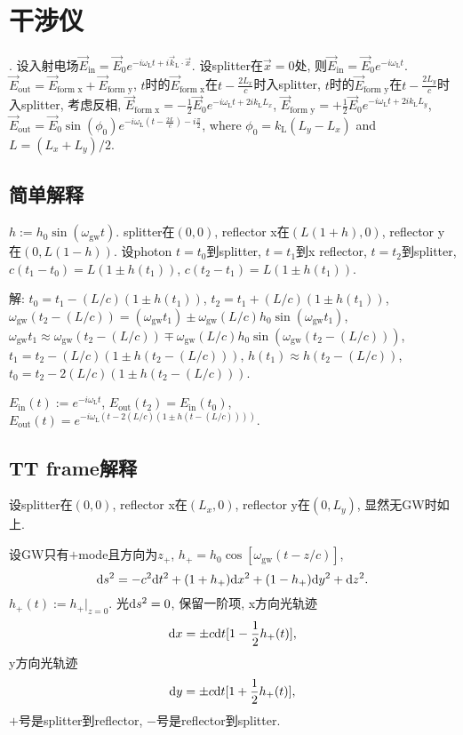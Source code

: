\chapter{干涉仪}

\cite{Maggiore2014}. 设入射电场$\vec{E}_\text{in}=\vec{E}_0e^{-i\omega_\text{L}t+i\vec{k}_\text{L}\cdot\vec{x}}$. 设splitter在$\vec{x}=0$处, 则$\vec{E}_\text{in}=\vec{E}_0e^{-i\omega_\text{L}t}$. $\vec{E}_\text{out}=\vec{E}_\text{form x}+\vec{E}_\text{form y}$, $t$时的$\vec{E}_\text{form x}$在$t-\frac{2L_x}{c}$时入splitter, $t$时的$\vec{E}_\text{form y}$在$t-\frac{2L_y}{c}$时入splitter, 考虑反相, $\vec{E}_\text{form x}=-\frac{1}{2}\vec{E}_0e^{-i\omega_\text{L}t+2ik_\text{L}L_x}$, $\vec{E}_\text{form y}=+\frac{1}{2}\vec{E}_0e^{-i\omega_\text{L}t+2ik_\text{L}L_y}$, $\vec{E}_\text{out}=\vec{E}_0\sin(\phi_0)e^{-i\omega_\text{L}(t-\frac{2L}{c})-i\frac{\pi}{2}}$, where $\phi_0=k_\text{L}(L_y-L_x)$ and $L=(L_x+L_y)/2$.

\section{简单解释}

$h:=h_0\sin(\omega_\text{gw} t)$. splitter在$(0,0)$, reflector x在$(L(1+h),0)$, reflector y在$(0,L(1-h))$. 设photon $t=t_0$到splitter, $t=t_1$到x reflector, $t=t_2$到splitter, $c(t_1-t_0)=L(1 \pm h(t_1))$, $c(t_2-t_1)=L(1 \pm h(t_1))$.

解: $t_0=t_1-(L/c)(1 \pm h(t_1))$, $t_2=t_1+(L/c)(1 \pm h(t_1))$, $\omega_\text{gw} (t_2-(L/c))=(\omega_\text{gw} t_1) \pm \omega_\text{gw} (L/c) h_0 \sin(\omega_\text{gw} t_1)$, $\omega_\text{gw} t_1 \approx \omega_\text{gw} (t_2-(L/c)) \mp \omega_\text{gw} (L/c) h_0 \sin(\omega_\text{gw} (t_2-(L/c)))$, $t_1=t_2-(L/c)(1 \pm h(t_2-(L/c)))$, $h(t_1) \approx h(t_2-(L/c))$, $t_0=t_2-2(L/c)(1 \pm h(t_2-(L/c)))$.

$E_\text{in}(t):=e^{-i\omega_\text{L} t}$, $E_\text{out}(t_2)=E_\text{in}(t_0)$, $E_\text{out}(t)=e^{-i\omega_\text{L} (t-2(L/c)(1 \pm h(t-(L/c))))}$.

\section{TT frame解释}

设splitter在$(0,0)$, reflector x在$(L_x,0)$, reflector y在$(0,L_y)$, 显然无GW时如上.

设GW只有$+$mode且方向为$z_+$, $h_+=h_0\cos[\omega_\text{gw}(t-z/c)]$, 
\begin{equation}
    \mathrm{d} s^2=-c^2\mathrm{d} t^2+(1 +h_+)\mathrm{d} x^2+ (1-h_+)\mathrm{d} y^2+\mathrm{d} z^2.
\end{equation}
$h_+(t):=h_+|_{z=0}$. 光$\mathrm{d} s^2=0$, 保留一阶项, x方向光轨迹
\begin{equation}
    \mathrm{d} x=\pm c\mathrm{d} t[1-\frac{1}{2}h_+(t)],
\end{equation}
y方向光轨迹
\begin{equation}
    \mathrm{d} y=\pm c\mathrm{d} t[1+\frac{1}{2}h_+(t)],
\end{equation}
$+$号是splitter到reflector, $-$号是reflector到splitter.

